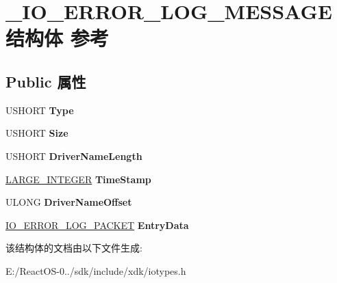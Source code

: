 \hypertarget{struct___i_o___e_r_r_o_r___l_o_g___m_e_s_s_a_g_e}{}\section{\+\_\+\+I\+O\+\_\+\+E\+R\+R\+O\+R\+\_\+\+L\+O\+G\+\_\+\+M\+E\+S\+S\+A\+G\+E结构体 参考}
\label{struct___i_o___e_r_r_o_r___l_o_g___m_e_s_s_a_g_e}
\subsection*{Public 属性}
\begin{DoxyCompactItemize}
\item 
\mbox{\label{struct___i_o___e_r_r_o_r___l_o_g___m_e_s_s_a_g_e_a27a164be34a00c6fcedc56961bd60c0f}} 
U\+S\+H\+O\+RT {\bfseries Type}
\item 
\mbox{\label{struct___i_o___e_r_r_o_r___l_o_g___m_e_s_s_a_g_e_a253fd883da8ce8aeb1a82b07eb118acb}} 
U\+S\+H\+O\+RT {\bfseries Size}
\item 
\mbox{\label{struct___i_o___e_r_r_o_r___l_o_g___m_e_s_s_a_g_e_ae17dfb9a3b5fae35782aebca19b7a274}} 
U\+S\+H\+O\+RT {\bfseries Driver\+Name\+Length}
\item 
\mbox{\label{struct___i_o___e_r_r_o_r___l_o_g___m_e_s_s_a_g_e_a9d0bff8892fea06a17dc14c1fb8d4354}} 
\hyperlink{union___l_a_r_g_e___i_n_t_e_g_e_r}{L\+A\+R\+G\+E\+\_\+\+I\+N\+T\+E\+G\+ER} {\bfseries Time\+Stamp}
\item 
\mbox{\label{struct___i_o___e_r_r_o_r___l_o_g___m_e_s_s_a_g_e_a85403c80cf02d2b9152bdb36de4d9844}} 
U\+L\+O\+NG {\bfseries Driver\+Name\+Offset}
\item 
\mbox{\label{struct___i_o___e_r_r_o_r___l_o_g___m_e_s_s_a_g_e_ab25de3cbb73e9c7e06ec240fe911daa8}} 
\hyperlink{struct___i_o___e_r_r_o_r___l_o_g___p_a_c_k_e_t}{I\+O\+\_\+\+E\+R\+R\+O\+R\+\_\+\+L\+O\+G\+\_\+\+P\+A\+C\+K\+ET} {\bfseries Entry\+Data}
\end{DoxyCompactItemize}


该结构体的文档由以下文件生成\+:\begin{DoxyCompactItemize}
\item 
E\+:/\+React\+O\+S-\/0../sdk/include/xdk/iotypes.\+h\end{DoxyCompactItemize}
